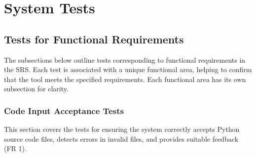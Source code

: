 \documentclass[12pt, titlepage]{article}
\begin{document}



\section{System Tests}

\subsection{Tests for Functional Requirements}

The subsections below outline tests corresponding to functional 
requirements in the SRS. Each test is associated with a unique 
functional area, helping to confirm that the tool meets the 
specified requirements. Each functional area has its own subsection 
for clarity.

\subsubsection{Code Input Acceptance Tests}

This section covers the tests for ensuring the system correctly accepts 
Python source code files, detects errors in invalid files, and provides 
suitable feedback (FR 1).
		
\end{document}
